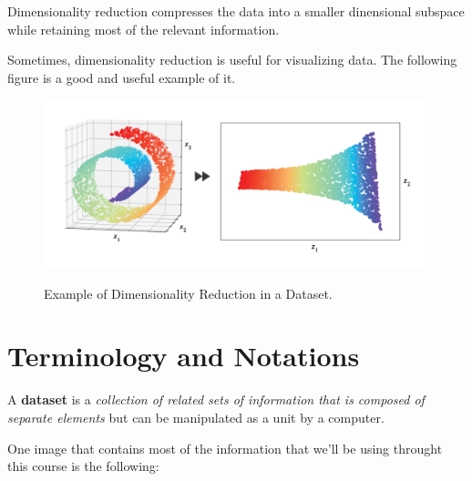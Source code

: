 \documentclass[../machine_learning_scikit.tex]{subfiles}
\begin{document}
    Dimensionality reduction compresses the data into a smaller dinensional subspace while retaining most of the relevant information.

    \begin{obs}
        Sometimes, dimensionality reduction is useful for visualizing data. The following figure is a good and useful example of it.
    \end{obs}

    \begin{figure}[h]
        \begin{minipage}{\textwidth}
            \centering
            \includegraphics[scale=1]{images/_4ac24da56df8429e8ef9dfa80b7c6ea8_9781801819312_01_07.png} \\
            \caption{Example of Dimensionality Reduction in a Dataset.}
            \label{figure:dimensionality_reduction_example}
        \end{minipage}
    \end{figure}

    \section{Terminology and Notations}
    
    \begin{mydef}
        A \textbf{dataset} is a \textit{collection of related sets of information that is composed of separate elements} but can be manipulated as a unit by a computer.
    \end{mydef}

    One image that contains most of the information that we'll be using throught this course is the following:
\end{document}
